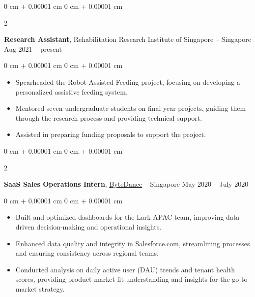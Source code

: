 \documentclass[10pt, letterpaper]{article}
\newenvironment{highlights}{
    \begin{itemize}[
        topsep=0.10 cm,
        parsep=0.10 cm,
        partopsep=0pt,
        itemsep=0pt,
        leftmargin=0 cm + 10pt
    ]
}{
    \end{itemize}
} %
\newenvironment{onecolentry}{
    \begin{adjustwidth}{
        0 cm + 0.00001 cm
    }{
        0 cm + 0.00001 cm
    }
}{
    \end{adjustwidth}
} %
\newenvironment{twocolentry}[2][]{
    \onecolentry
    \def\secondColumn{#2}
    \setcolumnwidth{\fill, 4.5 cm}
    \begin{paracol}{2}
}{
    \switchcolumn \raggedleft \secondColumn
    \end{paracol}
    \endonecolentry
} %
\begin{document}
        
        \begin{twocolentry}{
            Aug 2021 – present
        }
            \textbf{Research Assistant}, Rehabilitation Research Institute of Singapore -- Singapore\end{twocolentry}

        \vspace{0.10 cm}
        \begin{onecolentry}
            \begin{highlights}
                \item Spearheaded the Robot-Assisted Feeding project, focusing on developing a personalized assistive feeding system.
                \item Mentored seven undergraduate students on final year projects, guiding them through the research process and providing technical support.
                \item Assisted in preparing funding proposals to support the project.
            \end{highlights}
        \end{onecolentry}


        \vspace{0.2 cm}

        \begin{twocolentry}{
            May 2020 – July 2020
        }
            \textbf{SaaS Sales Operations Intern}, \href{https://www.bytedance.com/en/}{ByteDance} -- Singapore\end{twocolentry}

        \vspace{0.10 cm}
        \begin{onecolentry}
            \begin{highlights}
                \item Built and optimized dashboards for the Lark APAC team, improving data-driven decision-making and operational insights.
                \item Enhanced data quality and integrity in Salesforce.com, streamlining processes and ensuring consistency across regional teams.
                \item Conducted analysis on daily active user (DAU) trends and tenant health scores, providing product-market fit understanding and insights for the go-to-market strategy.
            \end{highlights}
        \end{onecolentry}
\end{document}
